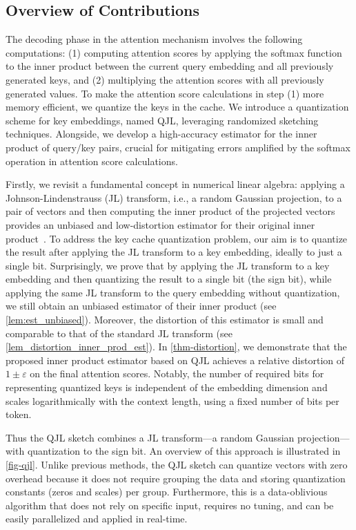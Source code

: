 \documentclass[11pt]{article}
\theoremstyle{plain}
\theoremstyle{definition}
\theoremstyle{remark}
\begin{document}
\subsection{Overview of Contributions} 

The decoding phase in the attention mechanism involves the following computations: (1) computing attention scores by applying the softmax function to the inner product between the current query embedding and all previously generated keys, and (2) multiplying the attention scores with all previously generated values. 
To make the attention score calculations in step (1) more memory efficient, we quantize the keys in the cache.
We introduce a quantization scheme for key embeddings, named QJL, leveraging randomized sketching techniques. Alongside, we develop a high-accuracy estimator for the inner product of query/key pairs, crucial for mitigating errors amplified by the softmax operation in attention score calculations.

Firstly, we revisit a fundamental concept in numerical linear algebra: applying a Johnson-Lindenstrauss (JL) transform, i.e., a random Gaussian projection, to a pair of vectors and then computing the inner product of the projected vectors provides an unbiased and low-distortion estimator for their original inner product~\cite{dasgupta2003elementary}.
To address the key cache quantization problem, our aim is to quantize the result after applying the JL transform to a key embedding, ideally to just a single bit. 
Surprisingly, we prove that by applying the JL transform to a key embedding and then quantizing the result to a single bit (the sign bit), while applying the same JL transform to the query embedding without quantization, we still obtain an unbiased estimator of their inner product (see \cref{lem:est_unbiased}). 
Moreover, the distortion of this estimator is small and comparable to that of the standard JL transform (see \cref{lem_distortion_inner_prod_est}).
In \cref{thm-distortion}, we demonstrate that the proposed inner product estimator based on QJL achieves a relative distortion of $1\pm\varepsilon$ on the final attention scores. 
Notably, the number of required bits for representing quantized keys is independent of the embedding dimension and scales logarithmically with the context length, using a fixed number of bits per token.


Thus the QJL sketch combines a JL transform—a random Gaussian projection—with quantization to the sign bit.
An overview of this approach is illustrated in \cref{fig-qjl}.
Unlike previous methods, the QJL sketch can quantize vectors with zero overhead because it does not require grouping the data and storing quantization constants (zeros and scales) per group.
Furthermore, this is a data-oblivious algorithm that does not rely on specific input, requires no tuning, and can be easily parallelized and applied in real-time. 
\end{document}
